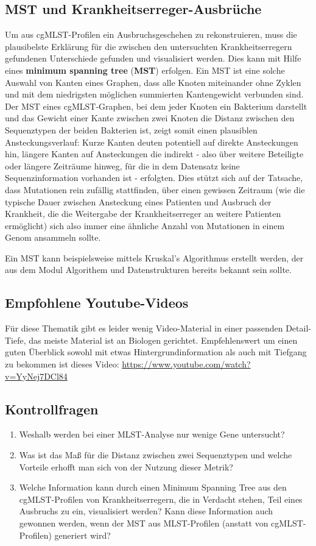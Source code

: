 \subsection{MST und Krankheitserreger-Ausbrüche}

Um aus cgMLST-Profilen ein Ausbruchsgeschehen zu rekonstruieren, muss die plausibelste Erklärung für die zwischen den untersuchten Krankheitserregern gefundenen Unterschiede gefunden und visualisiert werden. Dies kann mit Hilfe eines \textbf{minimum spanning tree} (\textbf{MST}) erfolgen. Ein MST ist eine solche Auswahl von Kanten eines Graphen, dass alle Knoten miteinander ohne Zyklen und mit dem niedrigsten möglichen summierten Kantengewicht verbunden sind. Der MST eines cgMLST-Graphen, bei dem jeder Knoten ein Bakterium darstellt und das Gewicht einer Kante zwischen zwei Knoten die Distanz zwischen den Sequenztypen der beiden Bakterien ist, zeigt somit einen plausiblen Ansteckungsverlauf: Kurze Kanten deuten potentiell auf direkte Ansteckungen hin, längere Kanten auf Ansteckungen die indirekt - also über weitere Beteiligte oder längere Zeiträume hinweg, für die in dem Datensatz keine Sequenzinformation vorhanden ist - erfolgten. Dies stützt sich auf der Tatsache, dass Mutationen rein zufällig stattfinden, über einen gewissen Zeitraum (wie die typische Dauer zwischen Ansteckung eines Patienten und Ausbruch der Krankheit, die die Weitergabe der Krankheitserreger an weitere Patienten ermöglicht) sich also immer eine ähnliche Anzahl von Mutationen in einem Genom ansammeln sollte. 

Ein MST kann beispielsweise mittels Kruskal's Algorithmus erstellt werden, der aus dem Modul Algorithem und Datenstrukturen bereits bekannt sein sollte. 

\subsection{Empfohlene Youtube-Videos}

Für diese Thematik gibt es leider wenig Video-Material in einer passenden Detail-Tiefe, das meiste Material ist an Biologen gerichtet. Empfehlenswert um einen guten Überblick sowohl mit etwas Hintergrundinformation als auch mit Tiefgang zu bekommen ist dieses Video: \href{https://www.youtube.com/watch?v=YyNej7DCl84}{https://www.youtube.com/watch?v=YyNej7DCl84}

\subsection{Kontrollfragen}
\begin{enumerate}
	\item Weshalb werden bei einer MLST-Analyse nur wenige Gene untersucht?
	\item Was ist das Maß für die Distanz zwischen zwei Sequenztypen und welche Vorteile erhofft man sich von der Nutzung dieser Metrik?
	\item Welche Information kann durch einen Minimum Spanning Tree aus den cgMLST-Profilen von Krankheitserregern, die in Verdacht stehen, Teil eines Ausbruchs zu ein, visualisiert werden? Kann diese Information auch gewonnen werden, wenn der MST aus MLST-Profilen (anstatt von cgMLST-Profilen) generiert wird?
\end{enumerate}
